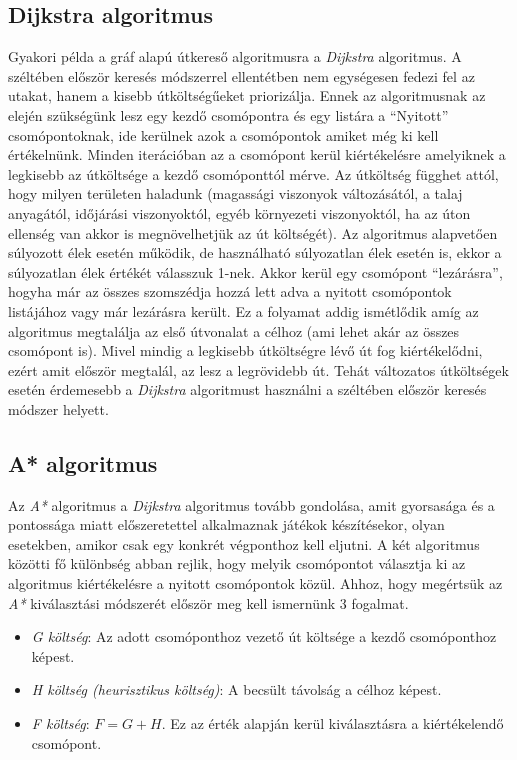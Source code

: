 \subsection{Dijkstra algoritmus}

\noindent Gyakori példa a gráf alapú útkereső algoritmusra a \textit{Dijkstra} algoritmus. A széltében először keresés módszerrel ellentétben nem egységesen fedezi fel az utakat, hanem a kisebb útköltségűeket priorizálja. Ennek az algoritmusnak az elején szükségünk lesz egy kezdő csomópontra és egy listára a “Nyitott” csomópontoknak, ide kerülnek azok a csomópontok amiket még ki kell értékelnünk. Minden iterációban az a csomópont kerül kiértékelésre amelyiknek a legkisebb az útköltsége a kezdő csomóponttól mérve. Az útköltség függhet attól, hogy milyen területen haladunk (magassági viszonyok változásától, a talaj anyagától, időjárási viszonyoktól, egyéb környezeti viszonyoktól, ha az úton ellenség van akkor is megnövelhetjük az út költségét). Az algoritmus alapvetően súlyozott élek esetén működik, de használható súlyozatlan élek esetén is, ekkor a súlyozatlan élek értékét válasszuk 1-nek. Akkor kerül egy csomópont “lezárásra”, hogyha már az összes szomszédja hozzá lett adva a nyitott csomópontok listájához vagy már lezárásra került. Ez a folyamat addig ismétlődik amíg az algoritmus megtalálja az első útvonalat a célhoz (ami lehet akár az összes csomópont is). Mivel mindig a legkisebb útköltségre lévő út fog kiértékelődni, ezért amit először megtalál, az lesz a legrövidebb út. Tehát változatos útköltségek esetén érdemesebb a \textit{Dijkstra} algoritmust használni a széltében először keresés módszer helyett.

\subsection{A* algoritmus}

\noindent Az \textit{A*} algoritmus a \textit{Dijkstra} algoritmus tovább gondolása, amit gyorsasága és a pontossága miatt előszeretettel alkalmaznak játékok készítésekor, olyan esetekben, amikor csak egy konkrét végponthoz kell eljutni. A két algoritmus közötti fő különbség abban rejlik, hogy melyik csomópontot választja ki az algoritmus kiértékelésre a nyitott csomópontok közül. Ahhoz, hogy megértsük az \textit{A*} kiválasztási módszerét először meg kell ismernünk 3 fogalmat.

\begin{itemize}
\item \textit{G költség}: Az adott csomóponthoz vezető út költsége a kezdő csomóponthoz képest.
\item \textit{H költség (heurisztikus költség)}: A becsült távolság a célhoz képest.
\item \textit{F költség}: $F = G + H$. Ez az érték alapján kerül kiválasztásra a kiértékelendő csomópont.
\end{itemize}

